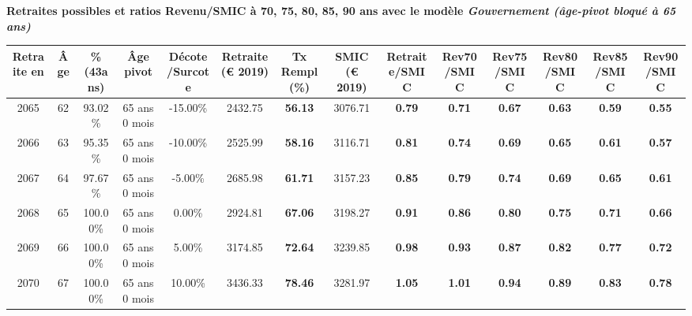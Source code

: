 {\bf \noindent Retraites possibles et ratios Revenu/SMIC à 70, 75, 80, 85, 90 ans avec le modèle \emph{Gouvernement (âge-pivot bloqué à 65 ans)}}  
 
\begin{adjustbox}{max width=\textwidth} 
\begin{tabular}[htb]{|c|c||c|c|c||c|c||c||c|c|c|c|c|c|} 
\hline 
 Retraite en &  Âge &  \%(43ans) &  Âge pivot &  Décote/Surcote &  Retraite (\euro{} 2019) &  Tx Rempl(\%) &  SMIC (\euro{} 2019) &  Retraite/SMIC &  Rev70/SMIC &  Rev75/SMIC &  Rev80/SMIC &  Rev85/SMIC &  Rev90/SMIC \\ 
\hline \hline 
 2065 &  62 &  93.02\% &  65 ans 0 mois &  -15.00\% &  2432.75 &  {\bf 56.13} &  3076.71 &  {\bf {\color{red} 0.79}} &  {\bf {\color{red} 0.71}} &  {\bf {\color{red} 0.67}} &  {\bf {\color{red} 0.63}} &  {\bf {\color{red} 0.59}} &  {\bf {\color{red} 0.55}} \\ 
\hline 
 2066 &  63 &  95.35\% &  65 ans 0 mois &  -10.00\% &  2525.99 &  {\bf 58.16} &  3116.71 &  {\bf {\color{red} 0.81}} &  {\bf {\color{red} 0.74}} &  {\bf {\color{red} 0.69}} &  {\bf {\color{red} 0.65}} &  {\bf {\color{red} 0.61}} &  {\bf {\color{red} 0.57}} \\ 
\hline 
 2067 &  64 &  97.67\% &  65 ans 0 mois &  -5.00\% &  2685.98 &  {\bf 61.71} &  3157.23 &  {\bf {\color{red} 0.85}} &  {\bf {\color{red} 0.79}} &  {\bf {\color{red} 0.74}} &  {\bf {\color{red} 0.69}} &  {\bf {\color{red} 0.65}} &  {\bf {\color{red} 0.61}} \\ 
\hline 
 2068 &  65 &  100.00\% &  65 ans 0 mois &  0.00\% &  2924.81 &  {\bf 67.06} &  3198.27 &  {\bf {\color{red} 0.91}} &  {\bf {\color{red} 0.86}} &  {\bf {\color{red} 0.80}} &  {\bf {\color{red} 0.75}} &  {\bf {\color{red} 0.71}} &  {\bf {\color{red} 0.66}} \\ 
\hline 
 2069 &  66 &  100.00\% &  65 ans 0 mois &  5.00\% &  3174.85 &  {\bf 72.64} &  3239.85 &  {\bf {\color{red} 0.98}} &  {\bf {\color{red} 0.93}} &  {\bf {\color{red} 0.87}} &  {\bf {\color{red} 0.82}} &  {\bf {\color{red} 0.77}} &  {\bf {\color{red} 0.72}} \\ 
\hline 
 2070 &  67 &  100.00\% &  65 ans 0 mois &  10.00\% &  3436.33 &  {\bf 78.46} &  3281.97 &  {\bf 1.05} &  {\bf 1.01} &  {\bf {\color{red} 0.94}} &  {\bf {\color{red} 0.89}} &  {\bf {\color{red} 0.83}} &  {\bf {\color{red} 0.78}} \\ 
\hline 
\hline 
\end{tabular} 
\end{adjustbox} 
 

